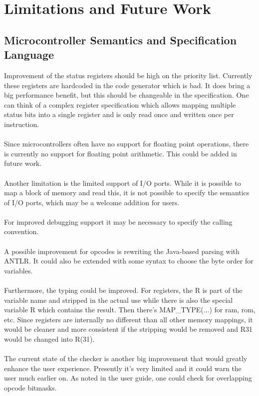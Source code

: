\chapter{Limitations and Future Work}

\section{Microcontroller Semantics and Specification Language}
Improvement of the status registers should be high on the priority list.
Currently these registers are hardcoded in the code generator which is bad. It
does bring a big performance benefit, but this should be changeable in the
specification. One can think of a complex register specification which allows
mapping multiple status bits into a single register and is only read once and
written once per instruction.\\
\\
Since microcontrollers often have no support for floating point operations,
there is currently no support for floating point arithmetic. This could be
added in future work.\\
\\
Another limitation is the limited support of I/O ports. While it is possible to
map a block of memory and read this, it is not possible to specify the
semantics of I/O ports, which may be a welcome addition for users.\\
\\
For improved debugging support it may be necessary to specify the calling
convention.\\
\\
A possible improvement for opcodes is rewriting the Java-based parsing with
ANTLR. It could also be extended with some syntax to choose the byte order for
variables.\\
\\
Furthermore, the typing could be improved. For registers, the R is part of the
variable name and stripped in the actual use while there is also the special
variable R which contains the result. Then there's MAP\_TYPE(...) for ram, rom,
etc. Since registers are internally no different than all other memory
mappings, it would be cleaner and more consistent if the stripping would be
removed and R31 would be changed into R(31).\\
\\
The current state of the checker is another big improvement that would greatly
enhance the user experience. Presently it's very limited and it could warn the
user much earlier on. As noted in the user guide, one could check for
overlapping opcode bitmasks.

